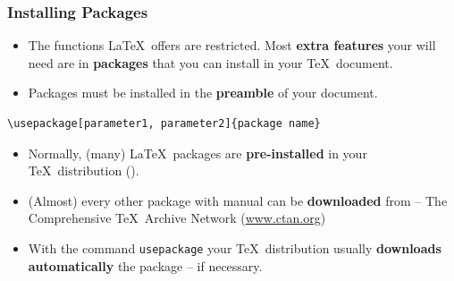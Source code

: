 
\begin{frame}[fragile]
\frametitle{Installing Packages}

\begin{itemize}
	\item The functions \LaTeX\ offers are restricted. Most \textbf{extra features} your will need are in \textbf{packages} that you can install in your \TeX\ document.

	\item Packages must be installed in the \textbf{preamble} of your document.
\end{itemize}

\begin{lstlisting}
\usepackage[parameter1, parameter2]{package name}
\end{lstlisting}

\pause 

\begin{itemize}
\item Normally, (many) \LaTeX\ packages are \textbf{pre-installed} in your \TeX\ distribution (\fe \href{http://miktex.org/}{}).

\item (Almost) every other package with manual can be \textbf{downloaded} from \textbf{} -- The Comprehensive \TeX\ Archive Network (\href{http://www.ctan.org/}{www.ctan.org})

\item With the command \lstinline|usepackage| your \TeX\ distribution usually \textbf{downloads automatically} the package -- if necessary.

\end{itemize}
\end{frame}


